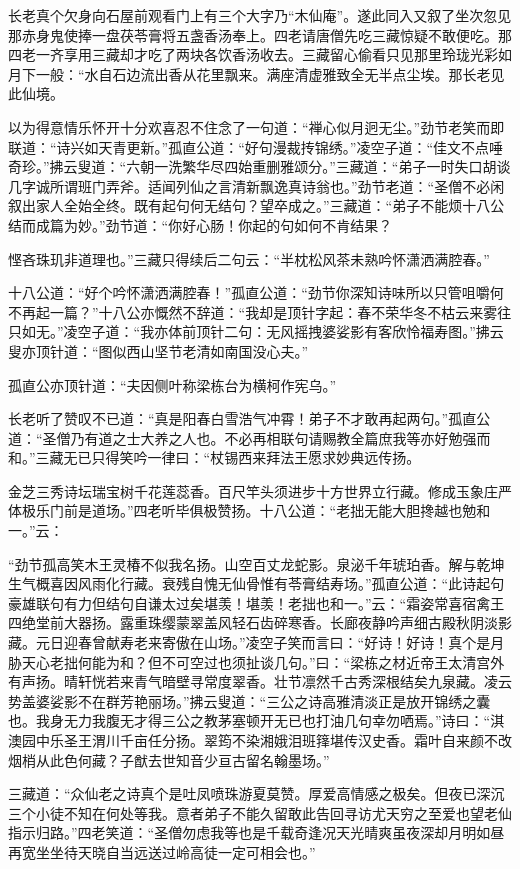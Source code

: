 \documentclass[12pt,UTF8]{ctexbook}
\begin{document}
长老真个欠身向石屋前观看门上有三个大字乃“木仙庵”。遂此同入又叙了坐次忽见那赤身鬼使捧一盘茯苓膏将五盏香汤奉上。四老请唐僧先吃三藏惊疑不敢便吃。那四老一齐享用三藏却才吃了两块各饮香汤收去。三藏留心偷看只见那里玲珑光彩如月下一般：“水自石边流出香从花里飘来。满座清虚雅致全无半点尘埃。那长老见此仙境。

以为得意情乐怀开十分欢喜忍不住念了一句道：“禅心似月迥无尘。”劲节老笑而即联道：“诗兴如天青更新。”孤直公道：“好句漫裁抟锦绣。”凌空子道：“佳文不点唾奇珍。”拂云叟道：“六朝一洗繁华尽四始重删雅颂分。”三藏道：“弟子一时失口胡谈几字诚所谓班门弄斧。适闻列仙之言清新飘逸真诗翁也。”劲节老道：“圣僧不必闲叙出家人全始全终。既有起句何无结句？望卒成之。”三藏道：“弟子不能烦十八公结而成篇为妙。”劲节道：“你好心肠！你起的句如何不肯结果？

悭吝珠玑非道理也。”三藏只得续后二句云：“半枕松风茶未熟吟怀潇洒满腔春。”

十八公道：“好个吟怀潇洒满腔春！”孤直公道：“劲节你深知诗味所以只管咀嚼何不再起一篇？”十八公亦慨然不辞道：“我却是顶针字起：春不荣华冬不枯云来雾往只如无。”凌空子道：“我亦体前顶针二句：无风摇拽婆娑影有客欣怜福寿图。”拂云叟亦顶针道：“图似西山坚节老清如南国没心夫。”

孤直公亦顶针道：“夫因侧叶称梁栋台为横柯作宪乌。”

长老听了赞叹不已道：“真是阳春白雪浩气冲霄！弟子不才敢再起两句。”孤直公道：“圣僧乃有道之士大养之人也。不必再相联句请赐教全篇庶我等亦好勉强而和。”三藏无已只得笑吟一律曰：“杖锡西来拜法王愿求妙典远传扬。

金芝三秀诗坛瑞宝树千花莲蕊香。百尺竿头须进步十方世界立行藏。修成玉象庄严体极乐门前是道场。”四老听毕俱极赞扬。十八公道：“老拙无能大胆搀越也勉和一。”云：

“劲节孤高笑木王灵椿不似我名扬。山空百丈龙蛇影。泉泌千年琥珀香。解与乾坤生气概喜因风雨化行藏。衰残自愧无仙骨惟有苓膏结寿场。”孤直公道：“此诗起句豪雄联句有力但结句自谦太过矣堪羡！堪羡！老拙也和一。”云：“霜姿常喜宿禽王四绝堂前大器扬。露重珠缨蒙翠盖风轻石齿碎寒香。长廊夜静吟声细古殿秋阴淡影藏。元日迎春曾献寿老来寄傲在山场。”凌空子笑而言曰：“好诗！好诗！真个是月胁天心老拙何能为和？但不可空过也须扯谈几句。”曰：“梁栋之材近帝王太清宫外有声扬。晴轩恍若来青气暗壁寻常度翠香。壮节凛然千古秀深根结矣九泉藏。凌云势盖婆娑影不在群芳艳丽场。”拂云叟道：“三公之诗高雅清淡正是放开锦绣之囊也。我身无力我腹无才得三公之教茅塞顿开无已也打油几句幸勿哂焉。”诗曰：“淇澳园中乐圣王渭川千亩任分扬。翠筠不染湘娥泪班箨堪传汉史香。霜叶自来颜不改烟梢从此色何藏？子猷去世知音少亘古留名翰墨场。”

三藏道：“众仙老之诗真个是吐凤喷珠游夏莫赞。厚爱高情感之极矣。但夜已深沉三个小徒不知在何处等我。意者弟子不能久留敢此告回寻访尤天穷之至爱也望老仙指示归路。”四老笑道：“圣僧勿虑我等也是千载奇逢况天光晴爽虽夜深却月明如昼再宽坐坐待天晓自当远送过岭高徒一定可相会也。”
\end{document}

